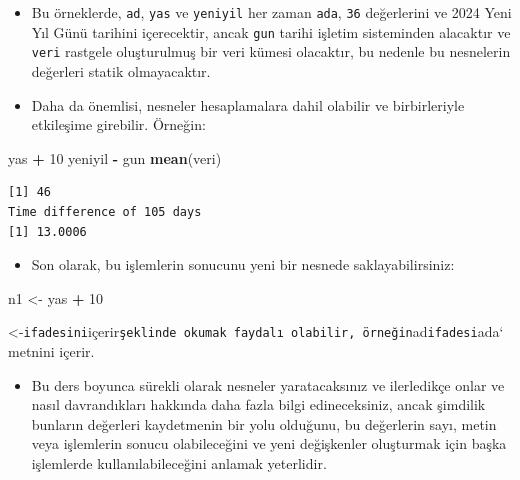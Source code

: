 \documentclass[
  oneside]{book}
\newenvironment{Shaded}{\begin{snugshade}}{\end{snugshade}}
\newcommand{\DecValTok}[1]{\textcolor[rgb]{0.00,0.00,0.81}{#1}}
\newcommand{\FunctionTok}[1]{\textcolor[rgb]{0.13,0.29,0.53}{\textbf{#1}}}
\newcommand{\NormalTok}[1]{#1}
\newcommand{\OtherTok}[1]{\textcolor[rgb]{0.56,0.35,0.01}{#1}}
\newcommand{\SpecialCharTok}[1]{\textcolor[rgb]{0.81,0.36,0.00}{\textbf{#1}}}
\providecommand{\tightlist}{%
  \setlength{\itemsep}{0pt}\setlength{\parskip}{0pt}}
\begin{document}
\begin{itemize}
\item
  Bu örneklerde, \texttt{ad}, \texttt{yas} ve \texttt{yeniyil} her zaman \texttt{ada}, \texttt{36} değerlerini ve 2024 Yeni Yıl Günü tarihini içerecektir, ancak \texttt{gun} tarihi işletim sisteminden alacaktır ve \texttt{veri} rastgele oluşturulmuş bir veri kümesi olacaktır, bu nedenle bu nesnelerin değerleri statik olmayacaktır.
\item
  Daha da önemlisi, nesneler hesaplamalara dahil olabilir ve birbirleriyle etkileşime girebilir. Örneğin:
\end{itemize}

\begin{Shaded}
\begin{Highlighting}[]
\NormalTok{yas }\SpecialCharTok{+} \DecValTok{10}
\NormalTok{yeniyil }\SpecialCharTok{{-}}\NormalTok{ gun}
\FunctionTok{mean}\NormalTok{(veri)}
\end{Highlighting}
\end{Shaded}

\begin{verbatim}
[1] 46
Time difference of 105 days
[1] 13.0006
\end{verbatim}

\begin{itemize}
\tightlist
\item
  Son olarak, bu işlemlerin sonucunu yeni bir nesnede saklayabilirsiniz:
\end{itemize}

\begin{Shaded}
\begin{Highlighting}[]
\NormalTok{n1 }\OtherTok{\textless{}{-}}\NormalTok{ yas }\SpecialCharTok{+} \DecValTok{10}
\end{Highlighting}
\end{Shaded}

\begin{try}
\textless-\texttt{ifadesini}içerir\texttt{şeklinde\ okumak\ faydalı\ olabilir,\ örneğin}ad\texttt{ifadesi}ada`
metnini içerir.
\end{try}

\begin{itemize}
\tightlist
\item
  Bu ders boyunca sürekli olarak nesneler yaratacaksınız ve ilerledikçe onlar ve nasıl davrandıkları hakkında daha fazla bilgi edineceksiniz, ancak şimdilik bunların değerleri kaydetmenin bir yolu olduğunu, bu değerlerin sayı, metin veya işlemlerin sonucu olabileceğini ve yeni değişkenler oluşturmak için başka işlemlerde kullanılabileceğini anlamak yeterlidir.
\end{itemize}
\end{document}
